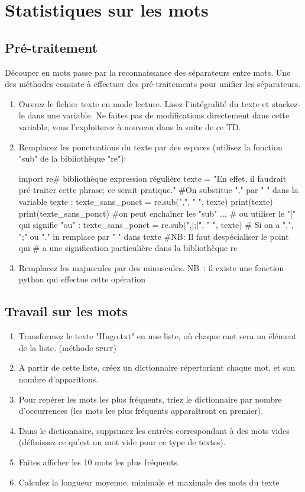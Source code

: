 \section{Statistiques sur les mots}

\subsection{Pré-traitement}
 Découper en mots passe par la reconnaissance des séparateurs entre mots.
Une des méthodes consiste à effectuer des pré-traitements pour unifier les séparateurs. %

\exer
\begin{enumerate}
  \item  Ouvrez le fichier texte en mode lecture. Lisez l'intégralité du texte et stockez-le dans une variable. Ne faites pas de modifications directement dans cette variable, vous l'exploiterez à nouveau dans la suite de ce TD.
  \item  Remplacez les ponctuations du texte par des espaces (utilisez la fonction "sub" de la bibliothèque "re"):
\begin{python}
import re# bibliothèque expression régulière
texte = "En effet, il faudrait pré-traiter cette phrase;
 ce serait pratique."
#On substitue "," par " " dans la variable texte :
texte_sans_ponct = re.sub(",", " ", texte)
print(texte)
print(texte_sans_ponct)
#on peut enchaîner les "sub" ...
# ou utiliser le "|" qui signifie "ou" :
texte_sans_ponct = re.sub(",|;|\.", " ", texte)
# Si on a ",", ";" ou "." in remplace par " " dans texte
#NB: Il faut despécialiser le point qui
# a une signification particulière dans la bibliothèque re
\end{python}

  \item  Remplacez les majuscules par des minuscules. NB : il existe une fonction python qui effectue cette opération
\end{enumerate}

\subsection{Travail sur les mots}
\begin{enumerate}
  \item  Transformez le texte "Hugo.txt" en une liste, où chaque mot sera un élément de la liste. (méthode \textsc{split})
  \item  A partir de cette liste, créez un dictionnaire répertoriant chaque mot, et son nombre d'apparitions.
  \item  Pour repérer les mots les plus fréquents, triez le dictionnaire par nombre d'occurrences (les mots les plus fréquents apparaîtront en premier).
  \item  Dans le dictionnaire, supprimez les entrées correspondant à des mots vides (définissez ce qu'est un mot vide pour ce type de textes).
  \item  Faites afficher les 10 mots les plus fréquents.
  \item  Calculez la longueur moyenne, minimale et maximale des mots du texte
\end{enumerate}

